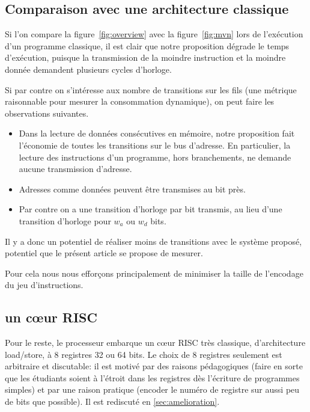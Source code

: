 \documentclass[architecture]{compas2018}
\begin{document}
\subsection{Comparaison avec une architecture classique}
Si l'on compare la figure~\ref{fig:overview} avec la figure~\ref{fig:mvn} lors de l'exécution d'un programme classique, il est clair que notre proposition dégrade le temps d'exécution, puisque la transmission de la moindre instruction et la moindre donnée demandent plusieurs cycles d'horloge.

Si par contre on s'intéresse aux nombre de transitions sur les fils (une métrique raisonnable pour mesurer la consommation dynamique), on peut faire les observations suivantes.

\begin{itemize}
\item Dans la lecture de données consécutives en mémoire, notre proposition fait l'économie de toutes les transitions sur le bus d'adresse.
  En particulier, la lecture des instructions d'un programme, hors branchements,  ne demande aucune transmission d'adresse.
\item Adresses comme données peuvent être transmises au bit près.
\item Par contre on a une transition d'horloge par bit transmis, au lieu d'une transition d'horloge pour $w_a$ ou $w_d$ bits.
\end{itemize}
Il y a donc un potentiel de réaliser moins de transitions avec le système proposé, potentiel que le présent article se propose de mesurer.

Pour cela nous nous efforçons principalement de minimiser la taille de l'encodage du jeu d'instructions.

\subsection{un c\oe ur  RISC}
Pour le reste, le processeur embarque un c\oe ur RISC très classique, d'architecture load/store, à 8 registres 32 ou 64 bits.  
Le choix de 8 registres seulement est arbitraire et discutable: il est motivé par des raisons pédagogiques (faire en sorte que les étudiants soient à l'étroit dans les registres  dès l'écriture de programmes simples) et par une raison pratique (encoder le numéro de registre sur aussi peu de bits que possible).
Il est rediscuté en \ref{sec:amelioration}. 
\end{document}

